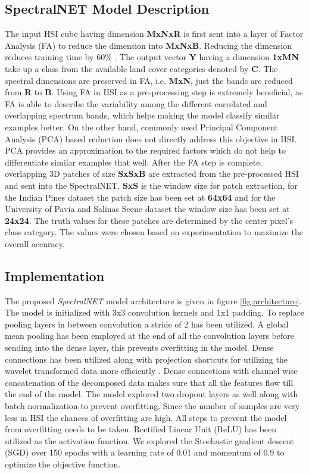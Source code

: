 \documentclass[journal]{IEEEtran}
\begin{document}
\subsection{SpectralNET Model Description}
The input HSI cube having dimension \textbf{MxNxR} is first sent into a layer of Factor Analysis (FA) to reduce the dimension into \textbf{MxNxB}. Reducing the dimension reduces training time by 60\% \cite{10.1007/978-3-030-14118-9_2}. The output vector \textbf{Y} having a dimension \textbf{1xMN} take up a class from the available land cover categories denoted by \textbf{C}. The spectral dimensions are preserved in FA, i.e. \textbf{MxN}, just the bands are reduced from \textbf{R} to \textbf{B}. Using FA in HSI as a pre-processing step is extremely beneficial, as FA is able to describe the variability among the different correlated and overlapping spectrum bands, which helps making the model classify similar examples better. On the other hand, commonly used Principal Component Analysis (PCA) based reduction does not directly address this objective in HSI. PCA provides an approximation to the required factors which do not help to differentiate similar examples that well. After the FA step is complete, overlapping 3D patches of size \textbf{SxSxB} are extracted from the pre-processed HSI and sent into the SpectralNET. \textbf{SxS} is the window size for patch extraction, for the Indian Pines dataset the patch size has been set at \textbf{64x64} and for the University of Pavia and Salinas Scene dataset the window size has been set at \textbf{24x24}. The truth values for these patches are determined by the center pixel's class category. The values were chosen based on experimentation to maximize the overall accuracy. 

\subsection{Implementation}
The proposed \textit{SpectralNET} model architecture is given in figure \ref{fig:architecture}. The model is initialized with 3x3 convolution kernels and 1x1 padding. To replace pooling layers in between convolution a stride of 2 has been utilized. A global mean pooling has been employed at the end of all the convolution layers before sending into the dense layer, this prevents overfitting in the model. Dense connections has been utilized along with projection shortcuts for utilizing the wavelet transformed data more efficiently \cite{he2016deep} \cite{huang2017densely}. Dense connections with channel wise concatenation of the decomposed data makes sure that all the features flow till the end of the model. The model explored two dropout layers as well along with batch normalization to prevent overfitting. Since the number of samples are very less in HSI the chances of overfitting are high. All steps to prevent the model from overfitting needs to be taken. Rectified Linear Unit (ReLU) has been utilized as the activation function. We explored the Stochastic gradient descent (SGD) over 150 epochs with a learning rate of 0.01 and momentum of 0.9 to optimize the objective function. %
\end{document}
